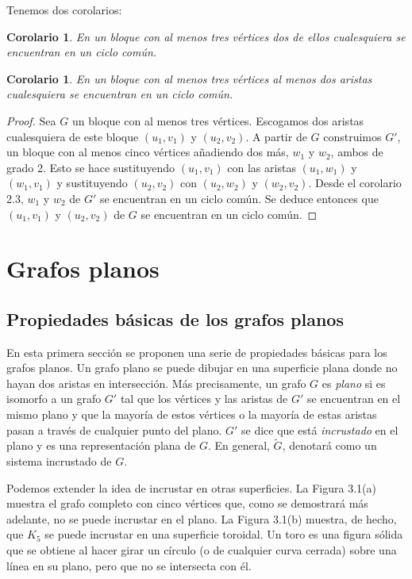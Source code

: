 \documentclass[10pt,a5paper]{book}
\newtheorem{cor}[]{Corolario}[chapter]
\begin{document}
Tenemos dos corolarios:
\begin{cor}
En un bloque con al menos tres vértices dos de ellos cualesquiera se encuentran en un ciclo común.
\end{cor}

\begin{cor}
En un bloque con al menos tres vértices al menos dos aristas cualesquiera se encuentran en un ciclo común.
\end{cor}

\begin{proof}
Sea $G$ un bloque con al menos tres vértices. Escogamos dos aristas cualesquiera de este bloque $(u_1,v_1)$ y $(u_2,v_2)$. A partir de $G$ construimos $G'$, un bloque con al menos cinco vértices añadiendo dos más, $w_1$ y $w_2$, ambos de grado 2. Esto se hace sustituyendo $(u_1,v_1)$ con las aristas $(u_1,w_1)$ y $(w_1,v_1)$ y sustituyendo $(u_2,v_2)$ con $(u_2,w_2)$ y $(w_2,v_2)$. Desde el corolario 2.3, $w_1$ y $w_2$ de $G'$ se encuentran en un ciclo común. Se deduce entonces que $(u_1,v_1)$ y $(u_2,v_2)$ de $G$ se encuentran en un ciclo común.
\end{proof}

\chapter{Grafos planos}

\section{Propiedades básicas de los grafos planos}

En esta primera sección se proponen una serie de propiedades básicas para los grafos planos. Un grafo plano se puede dibujar en una superficie plana donde no hayan dos aristas en intersección. Más precisamente, un grafo $G$ es \emph{plano} si es isomorfo a un grafo $G'$ tal que los vértices y las aristas de $G'$ se encuentran en el mismo plano y que la mayoría de estos vértices o la mayoría de estas aristas pasan a través de cualquier punto del plano. $G'$ se dice que está \emph{incrustado} en el plano y es una representación plana de $G$. En general, $\widetilde{G}$, denotará como un sistema incrustado de $G$.

Podemos extender la idea de incrustar en otras superficies. La Figura 3.1(a) muestra el grafo completo con cinco vértices que, como se demostrará más adelante, no se puede incrustar en el plano. La Figura 3.1(b) muestra, de hecho, que $K_5$ se puede incrustar en una superficie toroidal. Un toro es una figura sólida que se obtiene al hacer girar un círculo (o de cualquier curva cerrada) sobre una línea en su plano, pero que no se intersecta con él.
\end{document}
